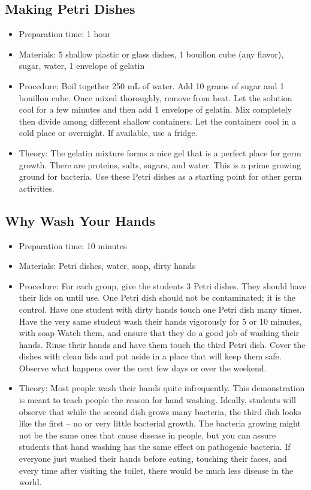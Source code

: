 \subsection{Making Petri Dishes}
\begin{itemize}
\item{Preparation time: 1 hour}
\item{Materials: 5 shallow plastic or glass dishes, 1 bouillon cube (any flavor), sugar, water, 1 envelope of gelatin}
\item{Procedure: Boil together 250 mL of water. Add 10 grams of sugar and 1 bouillon cube. Once mixed thoroughly, remove from heat. Let the solution cool for a few minutes and then add 1 envelope of gelatin. Mix completely then divide among different shallow containers. Let the containers cool in a cold place or overnight. If available, use a fridge.  }
\item{Theory: The gelatin mixture forms a nice gel that is a perfect place for germ growth. There are proteins, salts, sugars, and water. This is a prime growing ground for bacteria. Use these Petri dishes as a starting point for other germ activities.}
\end{itemize}

\subsection{Why Wash Your Hands}
\begin{itemize}
\item{Preparation time: 10 minutes}
\item{Materials: Petri dishes, water, soap, dirty hands}
\item{Procedure: For each group, give the students 3 Petri dishes. They should have their lids on until use. One Petri dish should not be contaminated; it is the control. Have one student with dirty hands touch one Petri dish many times. Have the very same student wash their hands vigorously for 5 or 10 minutes, with soap Watch them, and ensure that they do a good job of washing their hands. Rinse their hands and have them touch the third Petri dish. Cover the dishes with clean lids and put aside in a place that will keep them safe. Observe what happens over the next few days or over the weekend.}
\item{Theory: Most people wash their hands quite infrequently. This demonstration is meant to teach people the reason for hand washing. Ideally, students will observe that while the second dish grows many bacteria, the third dish looks like the first – no or very little bacterial growth. The bacteria growing might not be the same ones that cause disease in people, but you can assure students that hand washing has the same effect on pathogenic bacteria. If everyone just washed their hands before eating, touching their faces, and every time after visiting the toilet, there would be much less disease in the world.}
\end{itemize}


